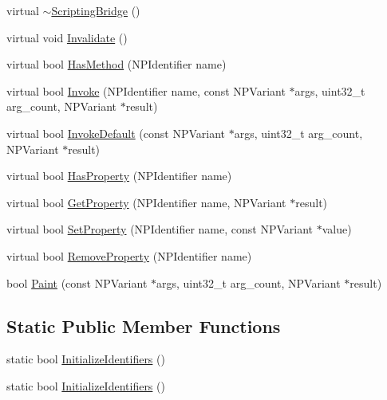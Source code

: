 \begin{DoxyCompactItemize}
virtual \hyperlink{classpi__generator_1_1_scripting_bridge_a59851d3f9406541b0805b87b874a1a49}{$\sim$ScriptingBridge} ()
\item 
virtual void \hyperlink{classpi__generator_1_1_scripting_bridge_a7b991ca4653d4a447d6a3f8760261780}{Invalidate} ()
\item 
virtual bool \hyperlink{classpi__generator_1_1_scripting_bridge_a5da4e0d7d9a2fe59b4838a40503a5a2e}{HasMethod} (NPIdentifier name)
\item 
virtual bool \hyperlink{classpi__generator_1_1_scripting_bridge_aed0d146930d7db6a548993629bb775f6}{Invoke} (NPIdentifier name, const NPVariant $\ast$args, uint32\_\-t arg\_\-count, NPVariant $\ast$result)
\item 
virtual bool \hyperlink{classpi__generator_1_1_scripting_bridge_abe1c6a84817b0a53c83527cbdc118dba}{InvokeDefault} (const NPVariant $\ast$args, uint32\_\-t arg\_\-count, NPVariant $\ast$result)
\item 
virtual bool \hyperlink{classpi__generator_1_1_scripting_bridge_adbcb9a1bd7516d027a55aabd1ab60cf1}{HasProperty} (NPIdentifier name)
\item 
virtual bool \hyperlink{classpi__generator_1_1_scripting_bridge_a6c4717a5a7d7c24c697d129904d0e0bf}{GetProperty} (NPIdentifier name, NPVariant $\ast$result)
\item 
virtual bool \hyperlink{classpi__generator_1_1_scripting_bridge_a81c45706acaa62a4ba74cc2f0d0150c4}{SetProperty} (NPIdentifier name, const NPVariant $\ast$value)
\item 
virtual bool \hyperlink{classpi__generator_1_1_scripting_bridge_a5f317f9adabc7082079a919d1163cc09}{RemoveProperty} (NPIdentifier name)
\item 
bool \hyperlink{classpi__generator_1_1_scripting_bridge_afcd2c9c3e990cae2d713e8bb5d84048d}{Paint} (const NPVariant $\ast$args, uint32\_\-t arg\_\-count, NPVariant $\ast$result)
\end{DoxyCompactItemize}
\subsection*{Static Public Member Functions}
\begin{DoxyCompactItemize}
\item 
static bool \hyperlink{classpi__generator_1_1_scripting_bridge_a05f2a65b751d12e6aeaa00bfd91ef83f}{InitializeIdentifiers} ()
\item 
static bool \hyperlink{classpi__generator_1_1_scripting_bridge_ab1274471c47d3f5d1a56f3a604e0efff}{InitializeIdentifiers} ()
\end{DoxyCompactItemize}

